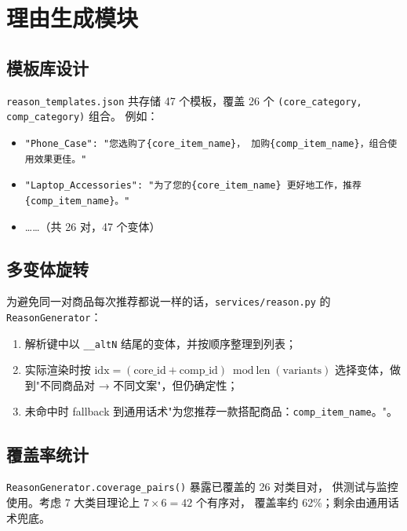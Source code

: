 \documentclass[12pt,a4paper]{article}
\begin{document}
\section{理由生成模块}

\subsection{模板库设计}
\texttt{reason\_templates.json} 共存储 47 个模板，覆盖 26 个
\texttt{(core\_category, comp\_category)} 组合。
例如：
\begin{itemize}[leftmargin=2em]
    \item \texttt{"Phone\_Case": "您选购了\{core\_item\_name\}，
          加购\{comp\_item\_name\}，组合使用效果更佳。"}
    \item \texttt{"Laptop\_Accessories": "为了您的\{core\_item\_name\}
          更好地工作，推荐\{comp\_item\_name\}。"}
    \item ……（共 26 对，47 个变体）
\end{itemize}

\subsection{多变体旋转}
为避免同一对商品每次推荐都说一样的话，\texttt{services/reason.py}
的 \texttt{ReasonGenerator}：
\begin{enumerate}[leftmargin=2em]
    \item 解析键中以 \texttt{\_\_altN} 结尾的变体，并按顺序整理到列表；
    \item 实际渲染时按
          $\text{idx} = (\text{core\_id} + \text{comp\_id}) \bmod
          \text{len}(\text{variants})$
          选择变体，做到"不同商品对 → 不同文案"，但仍确定性；
    \item 未命中时 fallback 到通用话术"为您推荐一款搭配商品：\texttt{comp\_item\_name}。"。
\end{enumerate}

\subsection{覆盖率统计}
\texttt{ReasonGenerator.coverage\_pairs()} 暴露已覆盖的 26 对类目对，
供测试与监控使用。考虑 7 大类目理论上 $7 \times 6 = 42$ 个有序对，
覆盖率约 62\%；剩余由通用话术兜底。

\end{document}
